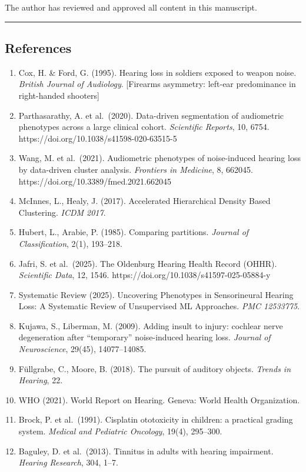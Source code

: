 \documentclass[
]{article}
\begin{document}
The author has reviewed and approved all content in this manuscript.

\begin{center}\rule{0.5\linewidth}{0.5pt}\end{center}

\subsection{References}\label{references}

\begin{enumerate}
\def\labelenumi{\arabic{enumi}.}
\setcounter{enumi}{-1}
\item
  Cox, H. \& Ford, G. (1995). Hearing loss in soldiers exposed to weapon noise.
  \emph{British Journal of Audiology}. {[}Firearms asymmetry: left-ear
  predominance in right-handed shooters{]}
\item
  Parthasarathy, A. et al.~(2020). Data-driven segmentation of audiometric
  phenotypes across a large clinical cohort. \emph{Scientific Reports}, 10,
  6754. https://doi.org/10.1038/s41598-020-63515-5
\item
  Wang, M. et al.~(2021). Audiometric phenotypes of noise-induced hearing loss
  by data-driven cluster analysis. \emph{Frontiers in Medicine}, 8, 662045.
  https://doi.org/10.3389/fmed.2021.662045
\item
  McInnes, L., Healy, J. (2017). Accelerated Hierarchical Density Based
  Clustering. \emph{ICDM 2017}.
\item
  Hubert, L., Arabie, P. (1985). Comparing partitions. \emph{Journal of
  Classification}, 2(1), 193--218.
\item
  Jafri, S. et al.~(2025). The Oldenburg Hearing Health Record (OHHR).
  \emph{Scientific Data}, 12, 1546. https://doi.org/10.1038/s41597-025-05884-y
\item
  Systematic Review (2025). Uncovering Phenotypes in Sensorineural Hearing Loss:
  A Systematic Review of Unsupervised ML Approaches. \emph{PMC 12533775}.
\item
  Kujawa, S., Liberman, M. (2009). Adding insult to injury: cochlear nerve
  degeneration after ``temporary'' noise-induced hearing loss. \emph{Journal of
  Neuroscience}, 29(45), 14077--14085.
\item
  Füllgrabe, C., Moore, B. (2018). The pursuit of auditory objects. \emph{Trends
  in Hearing}, 22.
\item
  WHO (2021). World Report on Hearing. Geneva: World Health Organization.
\item
  Brock, P. et al.~(1991). Cisplatin ototoxicity in children: a practical
  grading system. \emph{Medical and Pediatric Oncology}, 19(4), 295--300.
\item
  Baguley, D. et al.~(2013). Tinnitus in adults with hearing impairment.
  \emph{Hearing Research}, 304, 1--7.
\end{enumerate}
\end{document}
